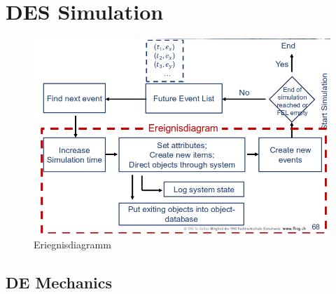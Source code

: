 \hypertarget{des-simulation}{%
\section{DES Simulation}\label{des-simulation}}

\begin{figure}
\centering
\includegraphics{figures/ereignisdiagram.png}
\caption{Eriegnisdiagramm}
\end{figure}

\hypertarget{de-mechanics}{%
\subsection{DE Mechanics}\label{de-mechanics}}

